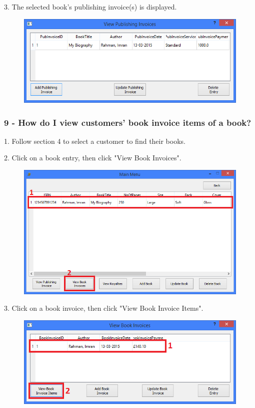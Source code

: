 3. The selected book's publishing invoice(s) is displayed.

\begin{figure}[H]
    \includegraphics[width=\textwidth]{./Manual/Tutorial/Q8/PubInvoices.png}
\end{figure}

\subsubsection{9 -  How do I view customers' book invoice items of a book?} \label{sssec:Q9}

1. Follow section 4 to select a customer to find their books.

2. Click on a book entry, then click "View Book Invoices".

\begin{figure}[H]
    \includegraphics[width=\textwidth]{./Manual/Tutorial/Q9/ViewBookInvoices.png}
\end{figure}

3. Click on a book invoice, then click "View Book Invoice Items".

\begin{figure}[H]
    \includegraphics[width=\textwidth]{./Manual/Tutorial/Q9/ViewBookInvoiceItems.png}
\end{figure}

